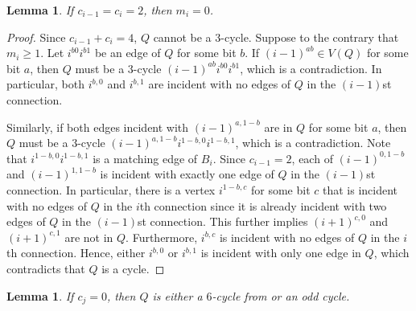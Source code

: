 \documentclass[11pt]{article}
\newtheorem{lemma}[theorem]{Lemma}
\theoremstyle{definition}
\theoremstyle{remark}
\begin{document}
\begin{lemma}
\label{lem:internalblock}
If $c_{i-1}=c_i=2$, then $m_i=0$.
\end{lemma}
\begin{proof}
Since $c_{i-1}+c_i=4$, $Q$ cannot be a $3$-cycle. 
Suppose to the contrary that $m_i\geq 1$.
Let $i^{b0}i^{b1}$ be an edge of $Q$ for some bit $b$.
If $(i-1)^{ab}\in V(Q)$ for some bit $a$, then $Q$ must be a $3$-cycle $(i-1)^{ab}i^{b0}i^{b1}$, which is a contradiction. 
In particular, both $i^{b,0}$ and $i^{b,1}$ are incident with no edges of $Q$ in the $(i-1)$st connection. 

Similarly, if both edges incident with $(i-1)^{a,1-b}$ are in $Q$ for some bit $a$, then $Q$ must be a $3$-cycle $(i-1)^{a,1-b}i^{1-b,0}i^{1-b,1}$, which is a contradiction. 
Note that $i^{1-b,0}i^{1-b,1}$ is a matching edge of $B_i$. 
Since $c_{i-1}=2$, each of $(i-1)^{0,1-b}$ and $(i-1)^{1,1-b}$ is incident with exactly one edge of $Q$ in the $(i-1)$st connection. 
In particular, there is a vertex $i^{1-b,c}$ for some bit $c$ that is incident with no edges of $Q$ in the $i$th connection since it is already incident with two edges of $Q$ in the $(i-1)$st connection. 
This further implies $(i+1)^{c,0}$ and $(i+1)^{c,1}$ are not in $Q$. 
Furthermore, $i^{b,c}$ is incident with no edges of $Q$ in the $i$th connection. 
Hence, either $i^{b,0}$ or $i^{b,1}$ is incident with only one edge in $Q$, which contradicts that $Q$ is a cycle.
\end{proof}

\begin{lemma}\label{lem:properinterval}
If $c_j=0$, then $Q$ is either a $6$-cycle from  or an odd cycle.
\end{lemma}
\end{document}
